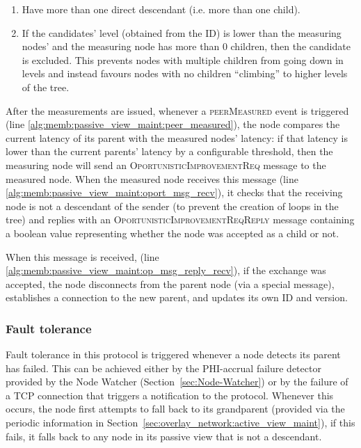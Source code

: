 \begin{enumerate}
    \item Have more than one direct descendant (i.e. more than one child). 
    
    \item If the candidates' level (obtained from the ID) is lower than the measuring nodes' and the measuring node has more than 0 children, then the candidate is excluded. This prevents nodes with multiple children from going down in levels and instead favours nodes with no children ``climbing'' to higher levels of the tree.
\end{enumerate}

After the measurements are issued, whenever a \textsc{peerMeasured} event is triggered (line \ref{alg:memb:passive_view_maint:peer_measured}), the node compares the current latency of its parent with the measured nodes' latency: if that latency is lower than the current parents' latency by a configurable threshold, then the measuring node will send an \textsc{OportunisticImprovementReq} message to the measured node. When the measured node receives this message (line \ref{alg:memb:passive_view_maint:oport_msg_recv}), it checks that the receiving node is not a descendant of the sender (to prevent the creation of loops in the tree) and replies with an \textsc{OportunisticImprovementReqReply} message containing a boolean value representing whether the node was accepted as a child or not.

When this message is received, (line \ref{alg:memb:passive_view_maint:op_msg_reply_recv}), if the exchange was accepted, the node disconnects from the parent node (via a special message), establishes a connection to the new parent, and updates its own ID and version.

\subsubsection{Fault tolerance}

Fault tolerance in this protocol is triggered whenever a node detects its parent has failed. This can be achieved either by the PHI-accrual failure detector provided by the Node Watcher (Section~\ref{sec:Node-Watcher}) or by the failure of a TCP connection that triggers a notification to the protocol. Whenever this occurs, the node first attempts to fall back to its grandparent (provided via the periodic information in Section~\ref{sec:overlay_network:active_view_maint}), if this fails, it falls back to any node in its passive view that is not a descendant.

